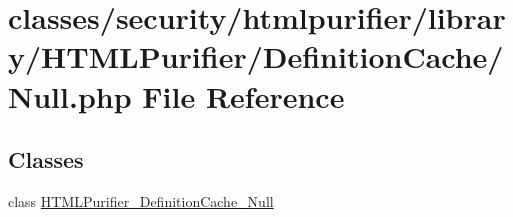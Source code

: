 \hypertarget{Null_8php}{\section{classes/security/htmlpurifier/library/\+H\+T\+M\+L\+Purifier/\+Definition\+Cache/\+Null.php File Reference}
\label{Null_8php}
}
\subsection*{Classes}
\begin{DoxyCompactItemize}
\item 
class \hyperlink{classHTMLPurifier__DefinitionCache__Null}{H\+T\+M\+L\+Purifier\+\_\+\+Definition\+Cache\+\_\+\+Null}
\end{DoxyCompactItemize}
